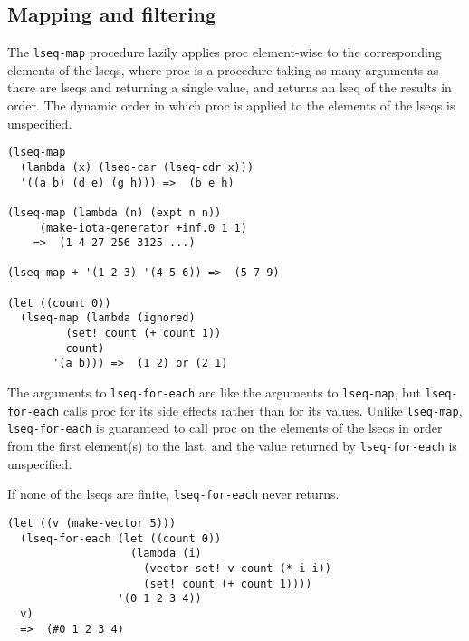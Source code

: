 \subsection{{Mapping and filtering}}\label{mapping-and-filtering}

\begin{entry}{%
  }

  The \texttt{lseq-map} procedure lazily applies proc element-wise to
  the corresponding elements of the lseqs, where proc is a procedure
  taking as many arguments as there are lseqs and returning a single
  value, and returns an lseq of the results in order. The dynamic
  order in which proc is applied to the elements of the lseqs is
  unspecified.

\begin{verbatim}
(lseq-map
  (lambda (x) (lseq-car (lseq-cdr x)))
  '((a b) (d e) (g h))) =>  (b e h)

(lseq-map (lambda (n) (expt n n))
     (make-iota-generator +inf.0 1 1)
    =>  (1 4 27 256 3125 ...)

(lseq-map + '(1 2 3) '(4 5 6)) =>  (5 7 9)

(let ((count 0))
  (lseq-map (lambda (ignored)
         (set! count (+ count 1))
         count)
       '(a b))) =>  (1 2) or (2 1)
\end{verbatim}
\end{entry}

\begin{entry}{%
  }

  The arguments to \texttt{lseq-for-each} are like the arguments to
  \texttt{lseq-map}, but \texttt{lseq-for-each} calls proc for its
  side effects rather than for its values. Unlike \texttt{lseq-map},
  \texttt{lseq-for-each} is guaranteed to call proc on the elements of
  the lseqs in order from the first element(s) to the last, and the
  value returned by \texttt{lseq-for-each} is unspecified.

  If none of the lseqs are finite, \texttt{lseq-for-each} never
  returns.

\begin{verbatim}
(let ((v (make-vector 5)))
  (lseq-for-each (let ((count 0))
                   (lambda (i)
                     (vector-set! v count (* i i))
                     (set! count (+ count 1))))
                 '(0 1 2 3 4))
  v)
  =>  (#0 1 2 3 4)
\end{verbatim}
\end{entry}

